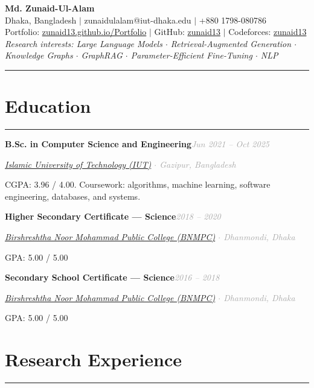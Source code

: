\documentclass[10pt]{article}
\newcommand{\sectionrule}{\vspace{-2pt}\noindent\textcolor{rulegray}{\rule{\linewidth}{1pt}}\vspace{6pt}}
\newcommand{\hrulefull}[1]{\noindent\textcolor{rulegray}{\rule{\linewidth}{#1}}}
\newcommand{\cvsection}[1]{%
  \Needspace{6\baselineskip}%
  \section{#1}\sectionrule%
}
\newcommand{\cvitem}[2]{%
  \Needspace{4\baselineskip}%
  \par\vspace{6pt}\noindent\textbf{#1}\hfill\textit{\textcolor{darkgray}{#2}}\par\vspace{1pt}%
}
\newcommand{\cvsub}[1]{\textit{\textcolor{darkgray}{#1}}\par\vspace{2pt}}
\begin{document}
\RaggedRight

\begin{center}
  {\fontsize{26}{28}\selectfont\bfseries\color{navy} Md. Zunaid-Ul-Alam}\\[4pt]
  {\small Dhaka, Bangladesh \; $|$ \; zunaidulalam@iut-dhaka.edu \; $|$ \; +880 1798-080786}\\[2pt]
  {\small Portfolio: \href{https://zunaid13.github.io/Portfolio/}{zunaid13.github.io/Portfolio} \; $|$ \;
  GitHub: \href{https://github.com/zunaid13}{zunaid13} \; $|$ \;
  Codeforces: \href{https://codeforces.com/profile/zunaid13}{zunaid13}}\\[4pt]
  {\small\itshape\color{darkgray} Research interests: Large Language Models $\cdot$ Retrieval-Augmented Generation $\cdot$ Knowledge Graphs $\cdot$ GraphRAG $\cdot$ Parameter-Efficient Fine-Tuning $\cdot$ NLP}
\end{center}
\vspace{-2pt}
\hrulefull{1.2pt}
\vspace{2pt}

\cvsection{Education}

\cvitem{B.Sc. in Computer Science and Engineering}{Jun 2021 -- Oct 2025}
\cvsub{\href{https://www.iutoic-dhaka.edu/}{Islamic University of Technology (IUT)} $\cdot$ Gazipur, Bangladesh}
CGPA: 3.96 / 4.00. Coursework: algorithms, machine learning, software engineering, databases, and systems.

\cvitem{Higher Secondary Certificate --- Science}{2018 -- 2020}
\cvsub{\href{https://www.noormohammadcollege.ac.bd/}{Birshreshtha Noor Mohammad Public College (BNMPC)} $\cdot$ Dhanmondi, Dhaka}
GPA: 5.00 / 5.00

\cvitem{Secondary School Certificate --- Science}{2016 -- 2018}
\cvsub{\href{https://www.noormohammadcollege.ac.bd/}{Birshreshtha Noor Mohammad Public College (BNMPC)} $\cdot$ Dhanmondi, Dhaka}
GPA: 5.00 / 5.00

\cvsection{Research Experience}
\end{document}
